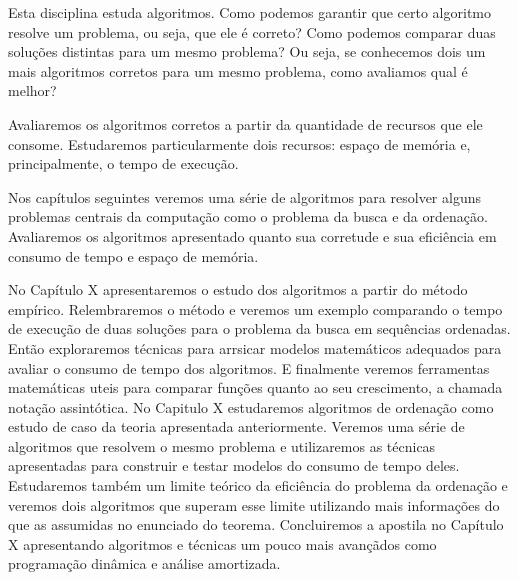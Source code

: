 Esta disciplina estuda algoritmos.
Como podemos garantir que certo algoritmo resolve um problema, ou seja, que ele é correto?
Como podemos comparar duas soluções distintas para um mesmo problema?
Ou seja, se conhecemos dois um mais algoritmos corretos para um mesmo problema, como avaliamos qual é melhor?

Avaliaremos os algoritmos corretos a partir da quantidade de recursos que ele consome.
Estudaremos particularmente dois recursos: espaço de memória e, principalmente, o tempo de execução.

Nos capítulos seguintes veremos uma série de algoritmos para resolver alguns problemas centrais da computação como o problema da busca e da ordenação.
Avaliaremos os algoritmos apresentado quanto sua corretude e sua eficiência em consumo de tempo e espaço de memória.

No Capítulo X apresentaremos o estudo dos algoritmos a partir do método empírico.
Relembraremos o método e veremos um exemplo comparando o tempo de execução de duas soluções para o problema da busca em sequências ordenadas.
Então exploraremos técnicas para arrsicar modelos matemáticos adequados para avaliar o consumo de tempo dos algoritmos.
E finalmente veremos ferramentas matemáticas uteis para comparar funções quanto ao seu crescimento, a chamada notação assintótica.
No Capitulo X estudaremos algoritmos de ordenação como estudo de caso da teoria apresentada anteriormente.
Veremos uma série de algoritmos que resolvem o mesmo problema e utilizaremos as técnicas apresentadas para construir e testar modelos do consumo de tempo deles.
Estudaremos também um limite teórico da eficiência do problema da ordenação e veremos dois algoritmos que superam esse limite utilizando mais informações do que as assumidas no enunciado do teorema.
Concluiremos a apostila no Capítulo X apresentando algoritmos e técnicas um pouco mais avançãdos como programação dinâmica e análise amortizada.

